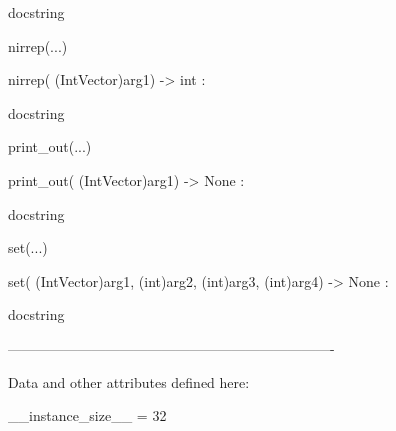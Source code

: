\documentclass[letterpaper,10pt,english]{sphinxmanual}
\begin{document}
\begin{description}
\begin{description}
\begin{DUlineblock}{0em}
\begin{DUlineblock}{\DUlineblockindent}
\begin{DUlineblock}{\DUlineblockindent}
\item[] docstring
\item[] 
\end{DUlineblock}
\end{DUlineblock}
\item[] nirrep(...)
\item[]
\begin{DUlineblock}{\DUlineblockindent}
\item[] nirrep( (IntVector)arg1) -\textgreater{} int :
\item[]
\begin{DUlineblock}{\DUlineblockindent}
\item[] docstring
\item[] 
\end{DUlineblock}
\end{DUlineblock}
\item[] print\_out(...)
\item[]
\begin{DUlineblock}{\DUlineblockindent}
\item[] print\_out( (IntVector)arg1) -\textgreater{} None :
\item[]
\begin{DUlineblock}{\DUlineblockindent}
\item[] docstring
\item[] 
\end{DUlineblock}
\end{DUlineblock}
\item[] set(...)
\item[]
\begin{DUlineblock}{\DUlineblockindent}
\item[] set( (IntVector)arg1, (int)arg2, (int)arg3, (int)arg4) -\textgreater{} None :
\item[]
\begin{DUlineblock}{\DUlineblockindent}
\item[] docstring
\item[] 
\end{DUlineblock}
\end{DUlineblock}
\item[] ----------------------------------------------------------------------
\item[] Data and other attributes defined here:
\item[] 
\item[] \_\_instance\_size\_\_ = 32
\item[] 

\end{DUlineblock}
\end{description}
\end{description}
\end{document}
